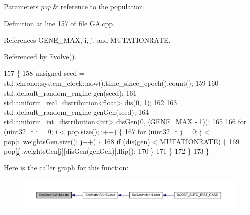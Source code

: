\begin{DoxyParams}{Parameters}
{\em pop} & reference to the population \\
\hline
\end{DoxyParams}


Definition at line 157 of file G\+A.\+cpp.



References G\+E\+N\+E\+\_\+\+M\+A\+X, i, j, and M\+U\+T\+A\+T\+I\+O\+N\+R\+A\+T\+E.



Referenced by Evolve().


\begin{DoxyCode}
157                                  \{
158   \textcolor{keywordtype}{unsigned} seed = std::chrono::system\_clock::now().time\_since\_epoch().count();
159 
160   std::default\_random\_engine gen(seed);
161   std::uniform\_real\_distribution<float> dis(0, 1);
162 
163   std::default\_random\_engine genGen(seed);
164   std::uniform\_int\_distribution<int> disGen(0, (\hyperlink{_soil_math_types_8h_aa5e1eb1a998e5ed69af2076cf318df4b}{GENE\_MAX} - 1));
165 
166   \textcolor{keywordflow}{for} (uint32\_t \hyperlink{_comparision_pictures_2_createtest_image_8m_a6f6ccfcf58b31cb6412107d9d5281426}{i} = 0; \hyperlink{_comparision_pictures_2_createtest_image_8m_a6f6ccfcf58b31cb6412107d9d5281426}{i} < pop.size(); \hyperlink{_comparision_pictures_2_createtest_image_8m_a6f6ccfcf58b31cb6412107d9d5281426}{i}++) \{
167     \textcolor{keywordflow}{for} (uint32\_t \hyperlink{_comparision_pictures_2_createtest_image_8m_ac86694252f8dfdb19aaeadc4b7c342c6}{j} = 0; \hyperlink{_comparision_pictures_2_createtest_image_8m_ac86694252f8dfdb19aaeadc4b7c342c6}{j} < pop[\hyperlink{_comparision_pictures_2_createtest_image_8m_a6f6ccfcf58b31cb6412107d9d5281426}{i}].weightsGen.size(); \hyperlink{_comparision_pictures_2_createtest_image_8m_ac86694252f8dfdb19aaeadc4b7c342c6}{j}++) \{
168       \textcolor{keywordflow}{if} (dis(gen) < \hyperlink{_soil_math_types_8h_a609754629b7669df73d7e8edda337162}{MUTATIONRATE}) \{
169         pop[\hyperlink{_comparision_pictures_2_createtest_image_8m_a6f6ccfcf58b31cb6412107d9d5281426}{i}].weightsGen[\hyperlink{_comparision_pictures_2_createtest_image_8m_ac86694252f8dfdb19aaeadc4b7c342c6}{j}][disGen(genGen)].flip();
170       \}
171     \}
172   \}
173 \}
\end{DoxyCode}


Here is the caller graph for this function\+:\nopagebreak
\begin{figure}[H]
\begin{center}
\leavevmode
\includegraphics[width=350pt]{class_soil_math_1_1_g_a_a489f2afd54086c14f45b654aeec0fe3c_icgraph}
\end{center}
\end{figure}


